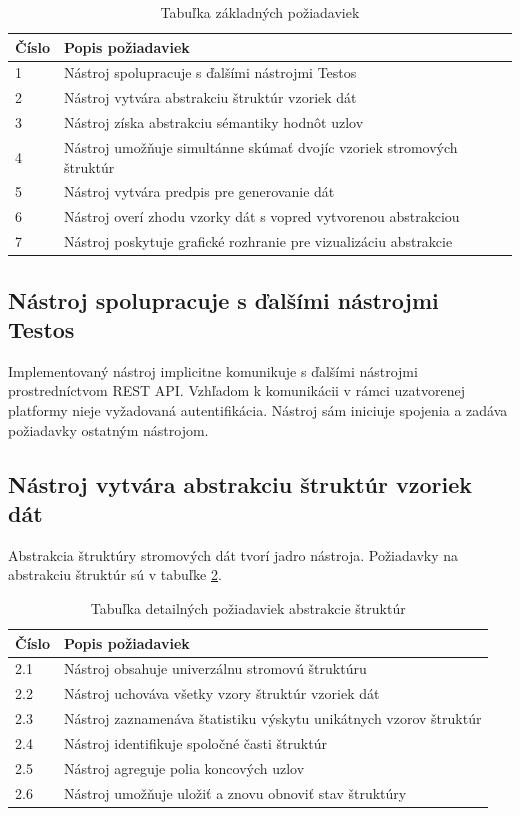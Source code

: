 \begin{table}[hbt]
	\centering
	\label{rq_general}
	\begin{tabular}{|p{0.8cm}|p{15cm}|}
		\hline
		\textbf{Číslo} & \textbf{Popis požiadaviek} \\ \hline
		1 & Nástroj spolupracuje s ďalšími nástrojmi Testos \\ \hline
		2 & Nástroj vytvára abstrakciu štruktúr vzoriek dát \\ \hline
		3 & Nástroj získa abstrakciu sémantiky hodnôt uzlov \\ \hline
		4 & Nástroj umožňuje simultánne skúmať dvojíc vzoriek stromových štruktúr \\ \hline
		5 & Nástroj vytvára predpis pre generovanie dát \\ \hline
		6 & Nástroj overí zhodu vzorky dát s vopred vytvorenou abstrakciou \\ \hline
		7 & Nástroj poskytuje grafické rozhranie pre vizualizáciu abstrakcie  \\ \hline
	\end{tabular}
	\caption{Tabuľka základných požiadaviek}
\end{table}

\subsection*{Nástroj spolupracuje s ďalšími nástrojmi Testos}
Implementovaný nástroj implicitne komunikuje s ďalšími nástrojmi prostredníctvom REST API. Vzhľadom k komunikácii v rámci uzatvorenej platformy nieje vyžadovaná autentifikácia. Nástroj sám iniciuje spojenia a zadáva požiadavky ostatným nástrojom.   
\subsection*{Nástroj vytvára abstrakciu štruktúr vzoriek dát}
Abstrakcia štruktúry stromových dát tvorí jadro nástroja. Požiadavky na abstrakciu štruktúr sú v tabuľke \ref{rq_2}.  
\begin{table}[hbt]
	\centering
	\label{rq_2}
	\begin{tabular}{|p{0.8cm}|p{15cm}|}
		\hline
		\textbf{Číslo} & \textbf{Popis požiadaviek} \\ \hline
		2.1 & Nástroj obsahuje univerzálnu stromovú štruktúru \\ \hline
		2.2 & Nástroj uchováva všetky vzory štruktúr vzoriek dát \\ \hline
		2.3 & Nástroj zaznamenáva štatistiku výskytu unikátnych vzorov štruktúr \\ \hline	
		2.4 & Nástroj identifikuje spoločné časti štruktúr  \\ \hline
		2.5 & Nástroj agreguje polia koncových uzlov  \\ \hline	
		2.6 & Nástroj umožňuje uložiť a znovu obnoviť stav štruktúry  \\ \hline	
	\end{tabular}
	\caption{Tabuľka detailných požiadaviek abstrakcie štruktúr}
\end{table}
